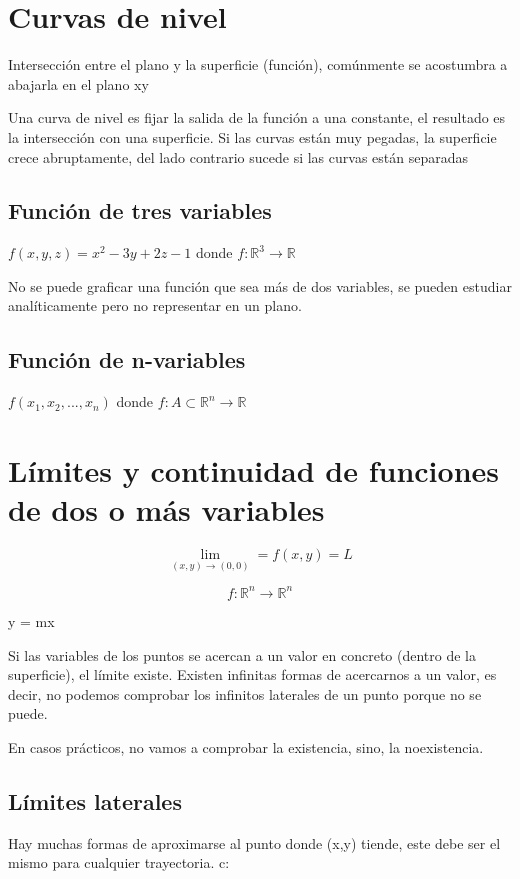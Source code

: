 \documentclass[letterpaper,12pt]{article}
\begin{document}
\begin{sloppypar}
\section{Curvas de nivel}
Intersección entre el plano y la superficie (función), comúnmente se acostumbra a abajarla en el plano xy 

Una curva de nivel es fijar la salida de la función a una constante, el resultado es la intersección con una superficie. Si las curvas están muy pegadas, la superficie crece abruptamente, del lado contrario sucede si las curvas están separadas

\subsection{Función de tres variables}
\begin{center}
    $f(x,y,z) = x^2 - 3y + 2z -1$ donde $f : \mathbb{R}^3 \rightarrow \mathbb{R} $
\end{center}

No se puede graficar una función que sea más de dos variables, se pueden estudiar analíticamente pero no representar en un plano.

\subsection{Función de n-variables}
\begin{center}
    $f(x_1, x_2, ..., x_n)$ donde $f : A \subset \mathbb{R}^{n} \rightarrow \mathbb{R}$
\end{center}

\section{Límites y continuidad de funciones de dos o más variables}
$$\lim_{(x,y) \to (0,0)}  = f(x,y) = L$$

$$f : \mathbb{R}^{n} \rightarrow \mathbb{R}^{n}$$

y = mx

Si las variables de los puntos se acercan a un valor en concreto (dentro de la superficie), el límite existe. Existen infinitas formas de acercarnos a un valor, es decir, no podemos comprobar los infinitos laterales de un punto porque no se puede.

En casos prácticos, no vamos a comprobar la existencia, sino, la noexistencia.



\subsection{Límites laterales}
Hay muchas formas de aproximarse al punto donde (x,y) tiende, este debe ser el mismo para cualquier trayectoria. c: 


\end{sloppypar}
\end{document}

